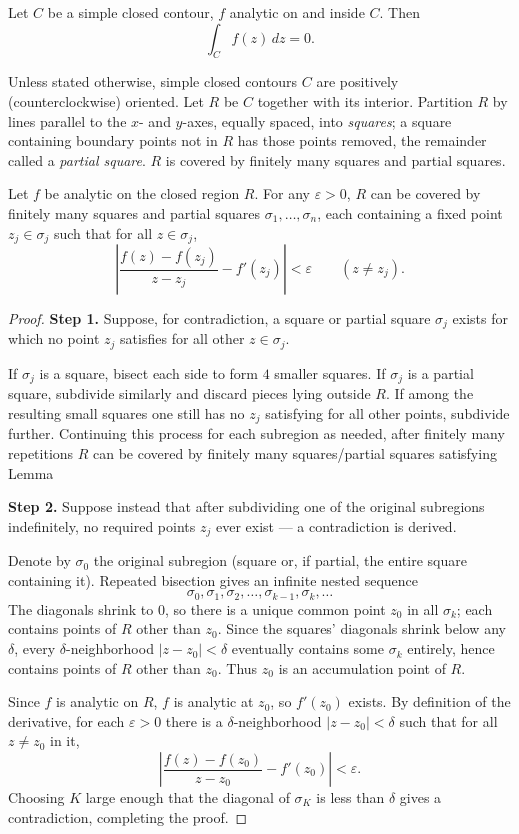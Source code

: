 \documentclass{article}
\begin{document}
\begin{theorem}
Let $C$ be a simple closed contour, $f$ analytic on and inside $C$. Then
\[
\int_C f(z)\,dz = 0.
\]
\end{theorem}

Unless stated otherwise, simple closed contours $C$ are positively (counterclockwise) oriented. Let $R$ be $C$ together with its interior. Partition $R$ by lines parallel to the $x$- and $y$-axes, equally spaced, into \emph{squares}; a square containing boundary points not in $R$ has those points removed, the remainder called a \emph{partial square}. $R$ is covered by finitely many squares and partial squares.

\begin{lemma}
Let $f$ be analytic on the closed region $R$. For any $\varepsilon>0$, $R$ can be covered by finitely many squares and partial squares $\sigma_1,\dots,\sigma_n$, each containing a fixed point $z_j\in\sigma_j$ such that for all $z\in\sigma_j$,
\[
\left|\frac{f(z)-f(z_j)}{z-z_j} - f'(z_j)\right| < \varepsilon \qquad (z\ne z_j). 
\]
\end{lemma}

\begin{proof}
\textbf{Step 1.} Suppose, for contradiction, a square or partial square $\sigma_j$ exists for which no point $z_j$ satisfies  for all other $z\in\sigma_j$.

If $\sigma_j$ is a square, bisect each side to form $4$ smaller squares. If $\sigma_j$ is a partial square, subdivide similarly and discard pieces lying outside $R$. If among the resulting small squares one still has no $z_j$ satisfying  for all other points, subdivide further. Continuing this process for each subregion as needed, after finitely many repetitions $R$ can be covered by finitely many squares/partial squares satisfying Lemma 

\textbf{Step 2.} Suppose instead that after subdividing one of the original subregions indefinitely, no required points $z_j$ ever exist — a contradiction is derived.

Denote by $\sigma_0$ the original subregion (square or, if partial, the entire square containing it). Repeated bisection gives an infinite nested sequence
\[
\sigma_0,\sigma_1,\sigma_2,\dots,\sigma_{k-1},\sigma_k,\dots \tag{4.52}
\]
The diagonals shrink to $0$, so there is a unique common point $z_0$ in all $\sigma_k$; each contains points of $R$ other than $z_0$. Since the squares' diagonals shrink below any $\delta$, every $\delta$-neighborhood $|z-z_0|<\delta$ eventually contains some $\sigma_k$ entirely, hence contains points of $R$ other than $z_0$. Thus $z_0$ is an accumulation point of $R$.

Since $f$ is analytic on $R$, $f$ is analytic at $z_0$, so $f'(z_0)$ exists. By definition of the derivative, for each $\varepsilon>0$ there is a $\delta$-neighborhood $|z-z_0|<\delta$ such that for all $z\ne z_0$ in it,
\[
\left|\frac{f(z)-f(z_0)}{z-z_0} - f'(z_0)\right| < \varepsilon.
\]
Choosing $K$ large enough that the diagonal of $\sigma_K$ is less than $\delta$ gives a contradiction, completing the proof.
\end{proof}
\end{document}
